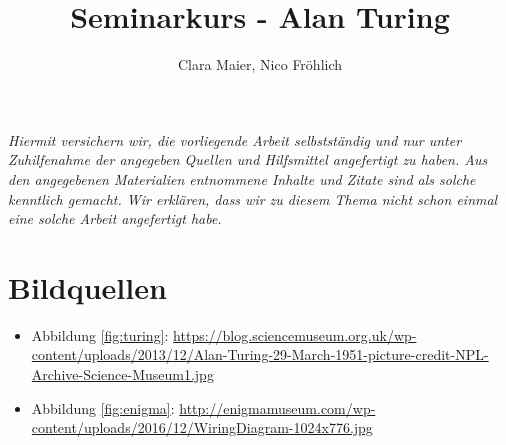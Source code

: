 \documentclass[11pt,a4paper]{article}
\author{Clara Maier, Nico Fröhlich}
\title{Seminarkurs - Alan Turing}
\renewcommand{\figurename}{Abbildung}
\begin{document}
\maketitle
\newpage
\emph{Hiermit versichern wir, die vorliegende Arbeit selbstständig und nur unter Zuhilfenahme der angegeben Quellen und Hilfsmittel angefertigt zu haben. Aus den angegebenen Materialien entnommene Inhalte und Zitate sind als solche kenntlich gemacht. Wir erklären, dass wir zu diesem Thema nicht schon einmal eine solche Arbeit angefertigt habe.}
\newpage

\tableofcontents
\newpage





\section*{Bildquellen}
{\renewcommand\labelitemi{}
\begin{itemize}
\item {\figurename} \ref{fig:turing}: \href{https://blog.sciencemuseum.org.uk/wp-content/uploads/2013/12/Alan-Turing-29-March-1951-picture-credit-NPL-Archive-Science-Museum1.jpg}{https://blog.sciencemuseum.org.uk/wp-content/uploads/2013/12/Alan-Turing-29-March-1951-picture-credit-NPL-Archive-Science-Museum1.jpg}
\item {\figurename} \ref{fig:enigma}: \href{http://enigmamuseum.com/wp-content/uploads/2016/12/WiringDiagram-1024x776.jpg}{http://enigmamuseum.com/wp-content/uploads/2016/12/WiringDiagram-1024x776.jpg}
\end{itemize}
}



\end{document}

